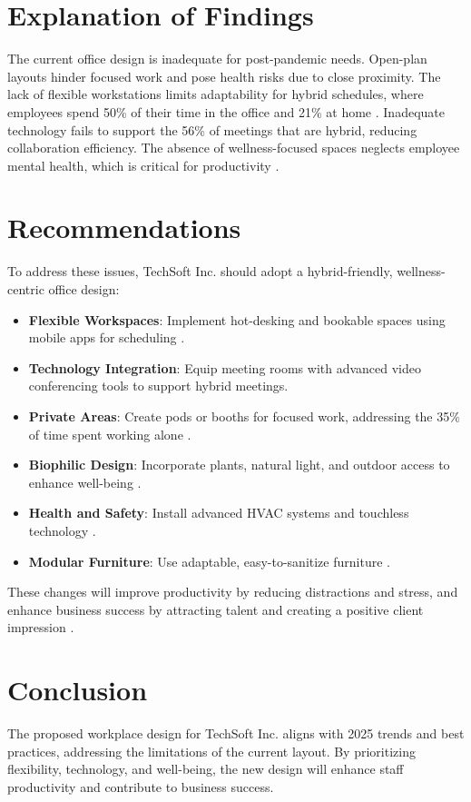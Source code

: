\documentclass[12pt]{article}
\begin{document}
\section{Explanation of Findings}
The current office design is inadequate for post-pandemic needs. Open-plan layouts hinder focused work and pose health risks due to close proximity. The lack of flexible workstations limits adaptability for hybrid schedules, where employees spend 50\% of their time in the office and 21\% at home \citep{gensler2024}. Inadequate technology fails to support the 56\% of meetings that are hybrid, reducing collaboration efficiency. The absence of wellness-focused spaces neglects employee mental health, which is critical for productivity \citep{forbes2019}.

\section{Recommendations}
To address these issues, TechSoft Inc. should adopt a hybrid-friendly, wellness-centric office design:
\begin{itemize}
    \item \textbf{Flexible Workspaces}: Implement hot-desking and bookable spaces using mobile apps for scheduling \citep{yourworkspace2025}.
    \item \textbf{Technology Integration}: Equip meeting rooms with advanced video conferencing tools to support hybrid meetings.
    \item \textbf{Private Areas}: Create pods or booths for focused work, addressing the 35\% of time spent working alone \citep{gensler2024}.
    \item \textbf{Biophilic Design}: Incorporate plants, natural light, and outdoor access to enhance well-being \citep{haiken2023}.
    \item \textbf{Health and Safety}: Install advanced HVAC systems and touchless technology \citep{workdesign2021}.
    \item \textbf{Modular Furniture}: Use adaptable, easy-to-sanitize furniture \citep{vicus2024}.
\end{itemize}
These changes will improve productivity by reducing distractions and stress, and enhance business success by attracting talent and creating a positive client impression \citep{moneypenny2025}.

\section{Conclusion}
The proposed workplace design for TechSoft Inc. aligns with 2025 trends and best practices, addressing the limitations of the current layout. By prioritizing flexibility, technology, and well-being, the new design will enhance staff productivity and contribute to business success.
\end{document}
